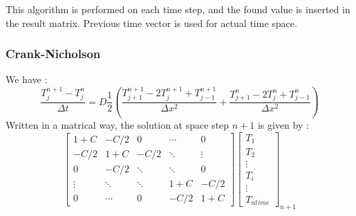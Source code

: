 \documentclass{article}
\begin{document}
                    This algorithm is performed on each time step, and the found value is inserted in the 
                    result matrix. Previous time vector is used for actual time space.

                    \subsubsection{Crank-Nicholson}
                        We have :
                        \begin{equation}
                            \frac{T_{j}^{n+1} - T_{j}^n}{\Delta t} = D\frac{1}{2} (\frac{T_{j+1}^{n+1}- 2T_{j}^{n+1} + T_{j-1}^{n+1}}{\Delta x^2}+\frac{T_{j+1}^{n}- 2T_{j}^{n} + T_{j-1}^{n}}{\Delta x^2})
                        \end{equation}
                        Written in a matrical way, the solution at space step $n+1$ is given by :
                        \begin{equation}
                            \begin{bmatrix}
                                1+C    & -C/2   & 0     & \cdots & 0 \\
                                -C/2   & 1+C    & -C/2   & \ddots & \vdots \\
                                0      & -C/2   & \ddots & \ddots & 0 \\
                                \vdots & \ddots & \ddots & 1+C   & -C/2\\
                                0      & \cdots & 0      & -C/2   & 1+C
                            \end{bmatrix}
                            \begin{bmatrix}
                                T_{1} \\
                                T_{2} \\
                                \vdots \\
                                T_{i} \\
                                \vdots \\
                                T_{ntime}
                            \end{bmatrix}_{n+1}
                            \label{eq:crank}
                        \end{equation}
\end{document}
